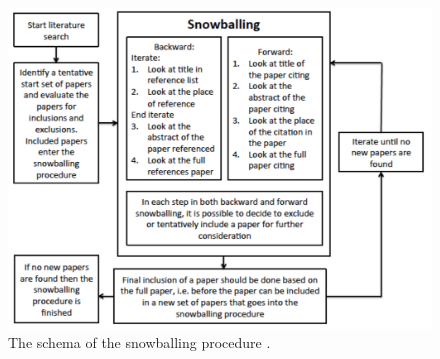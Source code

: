 \begin{figure}
    \centering
    \includegraphics[scale=0.25]{Images/pallinadicoca.png}
    \caption[Snowballing procedure.] {The schema of the snowballing procedure \cite{wohlin_guidelines_2014}.}
    \label{fig:pallinacoca}
\end{figure}
